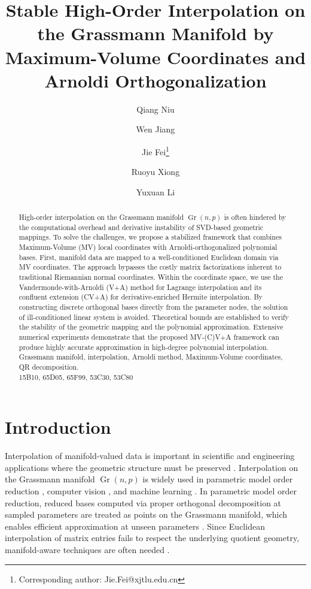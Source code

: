 \documentclass[11pt]{article}
\title{Stable High-Order Interpolation on the Grassmann Manifold by Maximum-Volume Coordinates and Arnoldi Orthogonalization}
\author[1]{Qiang Niu}
\author[1,2]{Wen Jiang}
\author[1]{Jie Fei\thanks{Corresponding author: Jie.Fei@xjtlu.edu.cn}}
\author[1]{Ruoyu Xiong}
\author[1,2]{Yuxuan Li}
\affil[1]{School of Mathematics and Physics, Xi'an Jiaotong-Liverpool University, Su Zhou, 215123, P. R. China}
\affil[2]{Department of Mathematical Sciences, University of Liverpool, Liverpool, United Kingdom}
\date{}
\DeclareMathOperator{\Gr}{Gr}
\begin{document}
\maketitle

\begin{abstract}
High-order interpolation on the Grassmann manifold $\Gr(n, p)$ is often hindered by the computational overhead and derivative instability of SVD-based geometric mappings. To solve the challenges, we propose a stabilized framework that combines Maximum-Volume (MV) local coordinates with Arnoldi-orthogonalized polynomial bases. First, manifold data are mapped to a well-conditioned Euclidean domain via MV coordinates. The approach bypasses the costly matrix factorizations inherent to traditional Riemannian normal coordinates. Within the coordinate space, we use the Vandermonde-with-Arnoldi (V+A) method for Lagrange interpolation and its confluent extension (CV+A) for derivative-enriched Hermite interpolation. By constructing discrete orthogonal bases directly from the parameter nodes, the solution of ill-conditioned linear system is avoided. Theoretical bounds are established to verify the stability of the geometric mapping and the polynomial approximation. Extensive numerical experiments demonstrate that the proposed MV-(C)V+A framework can produce highly accurate approximation in high-degree polynomial interpolation.\\

 Grassmann manifold, interpolation, Arnoldi method, Maximum-Volume coordinates, QR decomposition.\\

 15B10, 65D05, 65F99, 53C30, 53C80
\end{abstract}



\section{Introduction}

Interpolation of manifold-valued data is important in scientific and engineering applications where the geometric structure must be preserved \cite{ciaramella2026grassmann,absil2008optimization,gander2000change,Zhang2025LawsonConvexDual,amsallem2008interpolation,zimmermann2014locally}. Interpolation on the Grassmann manifold $\Gr(n, p)$ is widely used in parametric model order reduction \cite{benner2015survey, amsallem2008interpolation, Zhang2025AAAduplexer}, computer vision \cite{man2012advances, souza2023grassmannian}, and machine learning \cite{kaneko2013empirical, massart2020quotient}. In parametric model order reduction, reduced bases computed via proper orthogonal decomposition at sampled parameters are treated as points on the Grassmann manifold, which enables efficient approximation at unseen parameters \cite{pfaller2020parametric, hess2023data}. Since Euclidean interpolation of matrix entries fails to respect the underlying quotient geometry, manifold-aware techniques are often needed \cite{bendokat2020grassmann, absil2016differentiable}.
\end{document}
